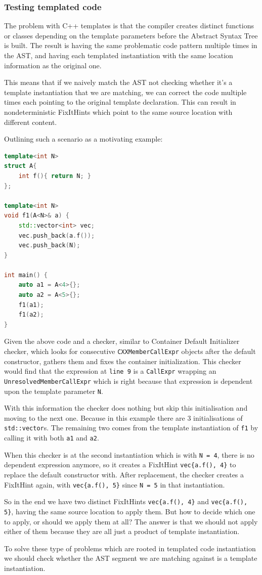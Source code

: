 \subsubsection{Testing templated code}
\par The problem with C++ templates is that the compiler creates distinct functions or classes depending on the template parameters before the Abstract Syntax Tree is built. The result is having the same problematic code pattern multiple times in the AST, and having each templated instantiation with the same location information as the original one. \medskip
\par This means that if we naively match the AST not checking whether it's a template instantiation that we are matching, we can correct the code multiple times each pointing to the original template declaration. This can result in nondeterministic FixItHints which point to the same source location with different content.  \pagebreak
\par Outlining such a scenario as a motivating example:
\begin{lstlisting}[language=c++, frame=single]
template<int N>
struct A{
	int f(){ return N; }
};

template<int N>
void f1(A<N>& a) {
	std::vector<int> vec;
	vec.push_back(a.f());
	vec.push_back(N);
}

int main() {
	auto a1 = A<4>{};
	auto a2 = A<5>{};
	f1(a1);
	f1(a2);
}
\end{lstlisting}
Given the above code and a checker, similar to Container Default Initializer checker, which looks for consecutive \verb|CXXMemberCallExpr| objects after the default constructor, gathers them and fixes the container initialization. This checker would find that the expression at \verb|line 9| is a \verb|CallExpr| wrapping an \verb|UnresolvedMemberCallExpr| which is right because that expression is dependent upon the template parameter \verb|N|. \medskip
\par With this information the checker does nothing but skip this initialisation and moving to the next one. Because in this example there are 3 initialisations of \verb|std::vector|s. The remaining two comes from the template instantiation of \verb|f1| by calling it with both \verb|a1| and \verb|a2|. \medskip
\par When this checker is at the second instantiation which is with \verb|N = 4|, there is no dependent expression anymore, so it creates a FixItHint \verb|vec{a.f(), 4}| to replace the default constructor with. After replacement, the checker creates a FixItHint again, with \verb|vec{a.f(), 5}| since \verb|N = 5| in that instantiation. \medskip
\par So in the end we have two distinct FixItHints  \verb|vec{a.f(), 4}| and  \verb|vec{a.f(), 5}|, having the same source location to apply them. But how to decide which one to apply, or should we apply them at all? The answer is that we should not apply either of them because they are all just a product of template instantiation.  \medskip
\par To solve these type of problems which are rooted in templated code instantiation we should check whether the AST segment we are matching against is a template instantiation.
